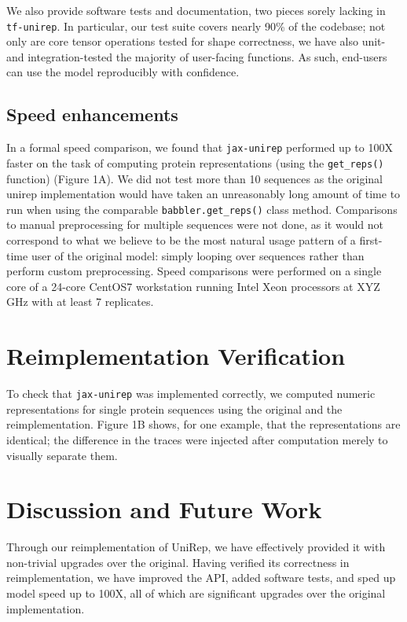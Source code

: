 \documentclass{bioinfo}
\begin{document}
We also provide software tests and documentation,
two pieces sorely lacking in \verb|tf-unirep|.
In particular, our test suite covers nearly 90\% of the codebase;
not only are core tensor operations tested for shape correctness,
we have also unit- and integration-tested
the majority of user-facing functions.
As such, end-users can use the model reproducibly with confidence.

\subsection{Speed enhancements}

In a formal speed comparison, we found that \verb|jax-unirep|
performed up to 100X faster on the task of computing protein representations
(using the \verb|get_reps()| function) (Figure 1A\vphantom{\ref{fig:01}}).
We did not test more than 10 sequences
as the original unirep implementation would have taken
an unreasonably long amount of time to run
when using the comparable \verb|babbler.get_reps()| class method.
Comparisons to manual preprocessing for multiple sequences were not done,
as it would not correspond to what we believe to be
the most natural usage pattern of a first-time user of the original model:
simply looping over sequences rather than perform custom preprocessing.
Speed comparisons were performed on a single core of a 24-core
CentOS7 workstation running Intel Xeon processors at XYZ GHz
with at least 7 replicates.

\section{Reimplementation Verification}

To check that \verb|jax-unirep| was implemented correctly,
we computed numeric representations for single protein sequences
using the original and the reimplementation.
Figure 1B\vphantom{\ref{fig:01}} shows, for one example,
that the representations are identical;
the difference in the traces were injected after computation
merely to visually separate them.

\section{Discussion and Future Work}

Through our reimplementation of UniRep,
we have effectively provided it with non-trivial upgrades over the original.
Having verified its correctness in reimplementation,
we have improved the API, added software tests,
and sped up model speed up to 100X,
all of which are significant upgrades over the original implementation.
\end{document}
